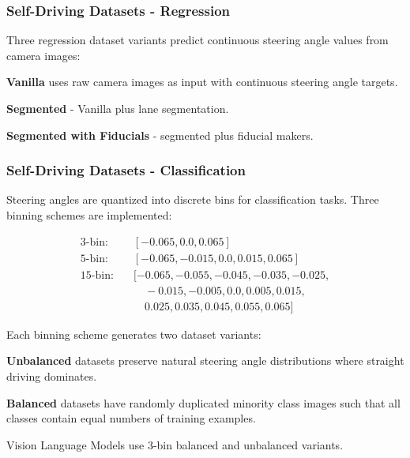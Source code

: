 
\subsubsection{Self-Driving Datasets - Regression}

Three regression dataset variants predict continuous steering angle values from camera images:

\textbf{Vanilla} uses raw camera images as input with continuous steering angle targets.

\textbf{Segmented} - Vanilla plus lane segmentation.

\textbf{Segmented with Fiducials} - segmented plus fiducial makers.


\subsubsection{Self-Driving Datasets - Classification}

Steering angles are quantized into discrete bins for classification tasks. Three binning schemes are implemented:

\begin{align*}
\text{3-bin:} &\quad [-0.065, 0.0, 0.065] \\
\text{5-bin:} &\quad [-0.065, -0.015, 0.0, 0.015, 0.065] \\
\text{15-bin:} &\quad [-0.065, -0.055, -0.045, -0.035, -0.025, \\
&\quad\quad -0.015, -0.005, 0.0, 0.005, 0.015, \\
&\quad\quad 0.025, 0.035, 0.045, 0.055, 0.065]
\end{align*}

Each binning scheme generates two dataset variants:

\textbf{Unbalanced} datasets preserve natural steering angle distributions where straight driving dominates.

\textbf{Balanced} datasets have randomly duplicated minority class images such that all classes contain equal numbers of training examples.

Vision Language Models use 3-bin balanced and unbalanced variants.


